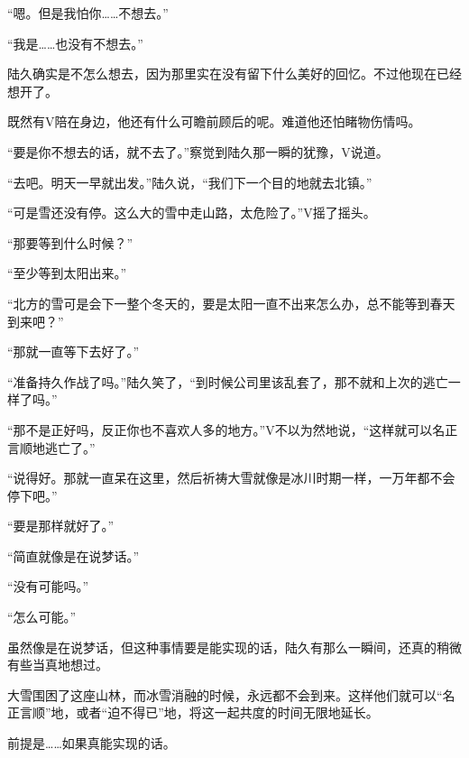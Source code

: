 “嗯。但是我怕你……不想去。”

“我是……也没有不想去。”

陆久确实是不怎么想去，因为那里实在没有留下什么美好的回忆。不过他现在已经想开了。

既然有V陪在身边，他还有什么可瞻前顾后的呢。难道他还怕睹物伤情吗。

“要是你不想去的话，就不去了。”察觉到陆久那一瞬的犹豫，V说道。

“去吧。明天一早就出发。”陆久说，“我们下一个目的地就去北镇。”

“可是雪还没有停。这么大的雪中走山路，太危险了。”V摇了摇头。

“那要等到什么时候？”

“至少等到太阳出来。”

“北方的雪可是会下一整个冬天的，要是太阳一直不出来怎么办，总不能等到春天到来吧？”

“那就一直等下去好了。”

“准备持久作战了吗。”陆久笑了，“到时候公司里该乱套了，那不就和上次的逃亡一样了吗。”

“那不是正好吗，反正你也不喜欢人多的地方。”V不以为然地说，“这样就可以名正言顺地逃亡了。”

“说得好。那就一直呆在这里，然后祈祷大雪就像是冰川时期一样，一万年都不会停下吧。”

“要是那样就好了。”

“简直就像是在说梦话。”

“没有可能吗。”

“怎么可能。”

虽然像是在说梦话，但这种事情要是能实现的话，陆久有那么一瞬间，还真的稍微有些当真地想过。

大雪围困了这座山林，而冰雪消融的时候，永远都不会到来。这样他们就可以“名正言顺”地，或者“迫不得已”地，将这一起共度的时间无限地延长。

前提是……如果真能实现的话。